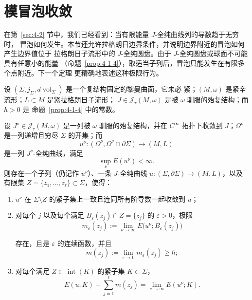 
\section{模冒泡收敛}\label{sec:4-6}

在第~\ref{sec:4-2} 节中，我们已经看到：当有限能量 $J$-全纯曲线列的导数趋于无穷时，
冒泡如何发生。本节还允许拉格朗日边界条件，并说明边界附近的冒泡如何产生边界值位于
拉格朗日子流形中的 $J$-全纯圆盘。由于 $J$-全纯圆盘或球面不可能具有任意小的能量
（命题~\ref{prop:4-1-4}），取适当子列后，冒泡只能发生在有限多个点附近。下一个定理
更精确地表述这种极限行为。

设 $(\Sigma,j_\Sigma,d\operatorname{vol}_\Sigma)$ 是一个复结构固定的黎曼曲面，它未必
紧；$(M,\omega)$ 是紧辛流形；$L\subset M$ 是紧拉格朗日子流形；
$J\in\mathcal J_\tau(M,\omega)$ 是被 $\omega$ 驯服的殆复结构；而 $\hbar>0$ 是
命题~\ref{prop:4-1-4} 中的常数。

\begin{theorem}\label{thm:4-6-1}
设 $J^\nu\in\mathcal J_\tau(M,\omega)$ 是一列被 $\omega$ 驯服的殆复结构，并在
$C^\infty$ 拓扑下收敛到 $J$；$\Omega^\nu$ 是一列递增且穷尽 $\Sigma$ 的开集；而
\[
  u^\nu:(\Omega^\nu,\Omega^\nu\cap\partial\Sigma)
  \longrightarrow(M,L)
\]
是一列 $J^\nu$-全纯曲线，满足
\[
  \sup_\nu E(u^\nu)<\infty.
\]
则存在一个子列（仍记作 $u^\nu$）、一条 $J$-全纯曲线
$u:(\Sigma,\partial\Sigma)\to(M,L)$，以及有限集
$Z=\{z_1,\ldots,z_\ell\}\subset\Sigma$，使得：
\begin{enumerate}[label=(\roman*),leftmargin=3em]
\item $u^\nu$ 在 $\Sigma\setminus Z$ 的紧子集上一致且连同所有阶导数一起收敛到
$u$；
\item 对每个 $j$ 以及每个满足
$B_\varepsilon(z_j)\cap Z=\{z_j\}$ 的 $\varepsilon>0$，极限
\[
  m_\varepsilon(z_j)
  :=\lim_{\nu\to\infty}E\bigl(u^\nu;B_\varepsilon(z_j)\bigr)
\]
\par\noindent 存在，且是 $\varepsilon$ 的连续函数，并且
\[
  m(z_j):=\lim_{\varepsilon\to0}m_\varepsilon(z_j)\ge\hbar;
\]
\item 对每个满足 $Z\subset\operatorname{int}(K)$ 的紧子集 $K\subset\Sigma$，
\[
  E(u;K)+\sum_{j=1}^\ell m(z_j)
  =\lim_{\nu\to\infty}E(u^\nu;K).
\]
\end{enumerate}
\end{theorem}

